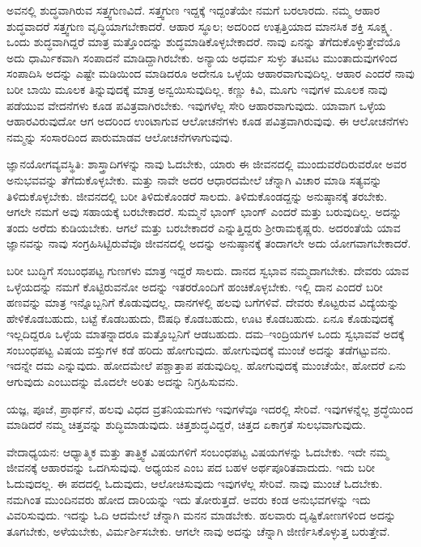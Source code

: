 ಅವನಲ್ಲಿ ಶುದ್ಧವಾಗಿರುವ ಸತ್ತ್ವಗುಣವಿದೆ. ಸತ್ತ್ವಗುಣ ಇದ್ದಕ್ಕೆ ಇದ್ದಂತೆಯೇ ನಮಗೆ ಬರಲಾರದು. ನಮ್ಮ ಆಹಾರ ಶುದ್ಧವಾದರೆ ಸತ್ತ್ವಗುಣ ವೃದ್ಧಿಯಾಗಬೇಕಾದರೆ. ಆಹಾರ ಸ್ಥೂಲ; ಅದರಿಂದ ಉತ್ಪತ್ತಿಯಾದ ಮಾನಸಿಕ ಶಕ್ತಿ ಸೂಕ್ಷ್ಮ. ಒಂದು ಶುದ್ಧವಾಗಿದ್ದರೆ ಮಾತ್ರ ಮತ್ತೊಂದನ್ನು ಶುದ್ಧಮಾಡಿಕೊಳ್ಳಬೇಕಾದರೆ. ನಾವು ಏನನ್ನು ತೆಗೆದುಕೊಳ್ಳುತ್ತೇವೆಯೊ ಅದು ಧಾರ್ಮಿಕವಾಗಿ ಸಂಪಾದನೆ ಮಾಡಿದ್ದಾಗಿರಬೇಕು. ಅನ್ಯಾಯ ಅಧರ್ಮ ಸುಳ್ಳು ತಟವಟ ಮುಂತಾದುವುಗಳಿಂದ ಸಂಪಾದಿಸಿ ಅದನ್ನು ಎಷ್ಟೇ ಮಡಿಯಿಂದ ಮಾಡಿದರೂ ಅದೇನೂ ಒಳ್ಳೆಯ ಆಹಾರವಾಗುವುದಿಲ್ಲ. ಆಹಾರ ಎಂದರೆ ನಾವು ಬರೀ ಬಾಯಿ ಮೂಲಕ ತಿನ್ನುವುದಕ್ಕೆ ಮಾತ್ರ ಅನ್ವಯಿಸುವುದಿಲ್ಲ. ಕಣ್ಣು ಕಿವಿ, ಮೂಗು ಇವುಗಳ ಮೂಲಕ ನಾವು ಪಡೆಯುವ ವೇದನೆಗಳು ಕೂಡ ಪವಿತ್ರವಾಗಿರಬೇಕು. ಇವುಗಳೆಲ್ಲ ಸೇರಿ ಆಹಾರವಾಗುವುದು. ಯಾವಾಗ ಒಳ್ಳೆಯ ಆಹಾರವಿರುವುದೋ ಆಗ ಅದರಿಂದ ಉಂಟಾಗುವ ಆಲೋಚನೆಗಳು ಕೂಡ ಪವಿತ್ರವಾಗಿರುವುವು. ಈ ಆಲೋಚನೆಗಳು ನಮ್ಮನ್ನು ಸಂಸಾರದಿಂದ ಪಾರುಮಾಡವ ಆಲೋಚನೆಗಳಾಗುವುವು.

ಜ್ಞಾನಯೋಗವ್ಯವಸ್ಥಿತಿ: ಶಾಸ್ತ್ರಾದಿಗಳನ್ನು ನಾವು ಓದಬೇಕು, ಯಾರು ಈ ಜೀವನದಲ್ಲಿ ಮುಂದುವರೆದಿರುವರೋ ಅವರ ಅನುಭವವನ್ನು ತೆಗೆದುಕೊಳ್ಳಬೇಕು. ಮತ್ತು ನಾವೇ ಅದರ ಆಧಾರದಮೇಲೆ ಚೆನ್ನಾಗಿ ವಿಚಾರ ಮಾಡಿ ಸತ್ಯವನ್ನು ತಿಳಿದುಕೊಳ್ಳಬೇಕು. ಜೀವನದಲ್ಲಿ ಬರೀ ತಿಳಿದುಕೊಂಡರೆ ಸಾಲದು. ತಿಳಿದುಕೊಂಡದ್ದನ್ನು ಅನುಷ್ಠಾನಕ್ಕೆ ತರಬೇಕು. ಆಗಲೇ ನಮಗೆ ಅವು ಸಹಾಯಕ್ಕೆ ಬರಬೇಕಾದರೆ. ಸುಮ್ಮನೆ ಭಾಂಗ್ ಭಾಂಗ್ ಎಂದರೆ ಮತ್ತು ಬರುವುದಿಲ್ಲ. ಅದನ್ನು ತಂದು ಅರೆದು ಕುಡಿಯಬೇಕು. ಆಗಲೆ ಮತ್ತು ಬರಬೇಕಾದರೆ ಎನ್ನುತ್ತಿದ್ದರು ಶ್ರೀರಾಮಕೃಷ್ಣರು. ಅದರಂತೆಯೆ ಯಾವ ಜ್ಞಾನವನ್ನು ನಾವು ಸಂಗ್ರಹಿಸಿಟ್ಟಿರುವೆವೊ ಜೀವನದಲ್ಲಿ ಅದನ್ನು ಅನುಷ್ಠಾನಕ್ಕೆ ತಂದಾಗಲೇ ಅದು ಯೋಗವಾಗಬೇಕಾದರೆ.

ಬರೀ ಬುದ್ಧಿಗೆ ಸಂಬಂಧಪಟ್ಟ ಗುಣಗಳು ಮಾತ್ರ ಇದ್ದರೆ ಸಾಲದು. ದಾನದ ಸ್ವಭಾವ ನಮ್ಮದಾಗಬೇಕು. ದೇವರು ಯಾವ ಒಳ್ಳೆಯದನ್ನು ನಮಗೆ ಕೊಟ್ಟಿರುವನೋ ಅದನ್ನು ಇತರರೊಂದಿಗೆ ಹಂಚಿಕೊಳ್ಳಬೇಕು. ಇಲ್ಲಿ ದಾನ ಎಂದರೆ ಬರೀ ಹಣವನ್ನು ಮಾತ್ರ ಇನ್ನೊಬ್ಬನಿಗೆ ಕೊಡುವುದಲ್ಲ. ದಾನಗಳಲ್ಲಿ ಹಲವು ಬಗೆಗಳಿವೆ. ದೇವರು ಕೊಟ್ಟರುವ ವಿದ್ಯೆಯನ್ನು ಹೇಳಿಕೊಡಬಹುದು, ಬಟ್ಟೆ ಕೊಡಬಹುದು, ಔಷಧಿ ಕೊಡಬಹುದು, ಊಟ ಕೊಡಬಹುದು. ಏನೂ ಕೊಡುವುದಕ್ಕೆ ಇಲ್ಲದಿದ್ದರೂ ಒಳ್ಳೆಯ ಮಾತನ್ನಾದರೂ ಮತ್ತೊಬ್ಬನಿಗೆ ಆಡಬಹುದು. ದಮ--ಇಂದ್ರಿಯಗಳ ಒಂದು ಸ್ವಭಾವವೆ ಅದಕ್ಕೆ ಸಂಬಂಧಪಟ್ಟ ವಿಷಯ ವಸ್ತುಗಳ ಕಡೆ ಹರಿದು ಹೋಗುವುದು. ಹೋಗುವುದಕ್ಕೆ ಮುಂಚೆ ಅದನ್ನು ತಡೆಗಟ್ಟುವನು. ಇದನ್ನೇ ದಮ ಎನ್ನುವುದು. ಹೋದಮೇಲೆ ಪಶ್ಚಾತ್ತಾಪ ಪಡುವುದಿಲ್ಲ. ಹೋಗುವುದಕ್ಕೆ ಮುಂಚೆಯೇ, ಹೋದರೆ ಏನು ಆಗುವುದು ಎಂಬುದನ್ನು ಮೊದಲೇ ಅರಿತು ಅದನ್ನು ನಿಗ್ರಹಿಸುವನು.

ಯಜ್ಞ, ಪೂಜೆ, ಪ್ರಾರ್ಥನೆ, ಹಲವು ವಿಧದ ವ್ರತನಿಯಮಗಳು ಇವುಗಳೆವೂ ಇದರಲ್ಲಿ ಸೇರಿವೆ. ಇವುಗಳನ್ನೆಲ್ಲ ಶ್ರದ್ಧೆಯಿಂದ ಮಾಡಿದರೆ ನಮ್ಮ ಚಿತ್ತವನ್ನು ಶುದ್ಧಿಮಾಡುವುದು. ಚಿತ್ತಶುದ್ಧವಿದ್ದರೆ, ಚಿತ್ತದ ಏಕಾಗ್ರತೆ ಸುಲಭವಾಗುವುದು.

ವೇದಾಧ್ಯಯನ: ಆಧ್ಯಾತ್ಮಿಕ ಮತ್ತು ತಾತ್ತ್ವಿಕ ವಿಷಯಗಳಿಗೆ ಸಂಬಂಧಪಟ್ಟ ವಿಷಯಗಳನ್ನು ಓದಬೇಕು. ಇದೇ ನಮ್ಮ ಜೀವನಕ್ಕೆ ಆಹಾರವನ್ನು ಒದಗಿಸುವುವು. ಅಧ್ಯಯನ ಎಂಬ ಪದ ಬಹಳ ಅರ್ಥಪೂರಿತವಾದುದು. ಇದು ಬರೀ ಓದುವುದಲ್ಲ. ಈ ಪದದಲ್ಲಿ ಓದುವುದು, ಆಲೋಚಿಸುವುದು ಇವುಗಳೆಲ್ಲ ಸೇರಿವೆ. ನಾವು ಮುಂಚೆ ಓದಬೇಕು. ನಮಗಿಂತ ಮುಂದಿನವರು ಹೋದ ದಾರಿಯನ್ನು ಇದು ತೋರುತ್ತದೆ. ಅವರು ಕಂಡ ಅನುಭವಗಳನ್ನು ಇದು ವಿವರಿಸುವುದು. ಇದನ್ನು ಓದಿ ಆದಮೇಲೆ ಚೆನ್ನಾಗಿ ಮನನ ಮಾಡಬೇಕು. ಹಲವಾರು ದೃಷ್ಟಿಕೋಣಗಳಿಂದ ಅದನ್ನು ತೂಗಬೇಕು, ಅಳೆಯಬೇಕು, ವಿರ್ಮರ್ಶಿಸಬೇಕು. ಆಗಲೇ ನಾವು ಅದನ್ನು ಚೆನ್ನಾಗಿ ಜೀರ್ಣಿಸಿಕೊಳ್ಳುತ್ತ ಬರುತ್ತೇವೆ.

